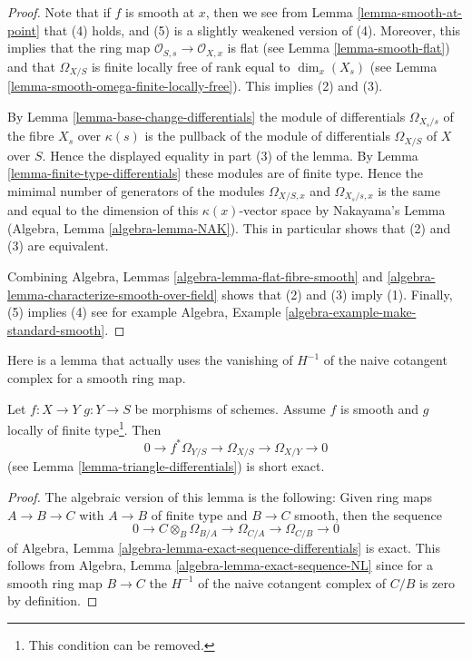 \begin{proof}
Note that if $f$ is smooth at $x$, then we see from Lemma
\ref{lemma-smooth-at-point} that (4) holds, and (5) is a slightly
weakened version of (4). Moreover, this implies that the ring
map $\mathcal{O}_{S, s} \to \mathcal{O}_{X, x}$ is flat (see
Lemma \ref{lemma-smooth-flat}) and that $\Omega_{X/S}$ is
finite locally free of rank equal to
$\dim_x(X_s)$ (see Lemma \ref{lemma-smooth-omega-finite-locally-free}).
This implies (2) and (3).

\medskip\noindent
By Lemma \ref{lemma-base-change-differentials}
the module of differentials $\Omega_{X_s/s}$ of the fibre $X_s$
over $\kappa(s)$ is the pullback of the module of differentials
$\Omega_{X/S}$ of $X$ over $S$. Hence the displayed equality in
part (3) of the lemma. By Lemma \ref{lemma-finite-type-differentials}
these modules are of finite type. Hence the mimimal number of
generators of the modules
$\Omega_{X/S, x}$ and $\Omega_{X_s/s, x}$ is the same and equal to the
dimension of this $\kappa(x)$-vector space by Nakayama's Lemma
(Algebra, Lemma \ref{algebra-lemma-NAK}). This in particular shows that
(2) and (3) are equivalent.

\medskip\noindent
Combining Algebra, Lemmas \ref{algebra-lemma-flat-fibre-smooth} and
\ref{algebra-lemma-characterize-smooth-over-field} shows that
(2) and (3) imply (1). Finally, (5) implies (4) see for example
Algebra, Example \ref{algebra-example-make-standard-smooth}.
\end{proof}

\noindent
Here is a lemma that actually uses the vanishing of $H^{-1}$
of the naive cotangent complex for a smooth ring map.

\begin{lemma}
\label{lemma-triangle-differentials-smooth}
Let $f : X \to Y$ $g : Y \to S$ be morphisms of schemes.
Assume $f$ is smooth and $g$ locally of finite type\footnote{This
condition can be removed.}. Then
$$
0 \to f^*\Omega_{Y/S} \to \Omega_{X/S} \to \Omega_{X/Y} \to 0
$$
(see Lemma \ref{lemma-triangle-differentials}) is short exact.
\end{lemma}

\begin{proof}
The algebraic version of this lemma is the following:
Given ring maps $A \to B \to C$ with $A \to B$ of finite
type and $B \to C$ smooth, then the sequence
$$
0 \to C \otimes_B \Omega_{B/A} \to \Omega_{C/A} \to \Omega_{C/B} \to 0
$$
of Algebra, Lemma \ref{algebra-lemma-exact-sequence-differentials} is exact.
This follows from Algebra, Lemma \ref{algebra-lemma-exact-sequence-NL} since
for a smooth ring map $B \to C$ the $H^{-1}$ of the naive cotangent complex
of $C/B$ is zero by definition.
\end{proof}


